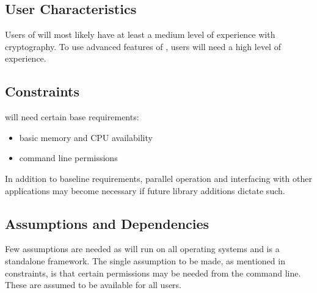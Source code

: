 
\subsection{User Characteristics}

Users of \cry{} will most likely have at least a medium
level of experience with cryptography. To use advanced
features of \cry, users will need a high level of \cryptos{}
experience.


\subsection{Constraints}

\cry{} will need certain base requirements:
\begin{itemize}
  \item basic memory and CPU availability
  \item command line permissions
\end{itemize}

In addition to baseline requirements, parallel operation and
interfacing with other applications may become necessary if
future library additions dictate such.


\subsection{Assumptions and Dependencies}

Few assumptions are needed as \cry{} will run on all
operating systems and is a standalone framework. The single
assumption to be made, as mentioned in constraints, is that
certain permissions may be needed from the command line.
These are assumed to be available for all users.

